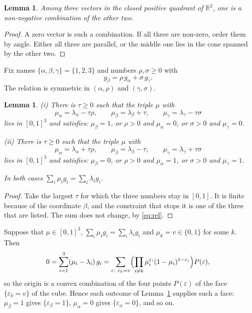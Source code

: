 \documentclass[11pt]{article}
\newtheorem{lemma}[theorem]{Lemma}
\theoremstyle{definition}
\newcommand{\R}{\mathbb{R}}
\newcommand{\eps}{\varepsilon}
\begin{document}
\begin{lemma}\label{lem:middle}
Among three vectors in the closed positive quadrant of $\R^2$, one is a
non-negative combination of the other two.
\end{lemma}
\begin{proof}
A zero vector is such a combination.  If all three are non-zero, order
them by angle.  Either all three are parallel, or the middle one lies in
the cone spanned by the other two.
\end{proof}

Fix names $\{\alpha,\beta,\gamma\}=\{1,2,3\}$ and numbers
$\rho,\sigma\ge0$ with
\begin{equation}\label{eq:rel}
 g_\beta=\rho\,g_\alpha+\sigma\,g_\gamma .
\end{equation}
The relation is symmetric in $(\alpha,\rho)$ and $(\gamma,\sigma)$.

\begin{lemma}\label{lem:slide}
\textup{(i)} There is $\tau\ge0$ such that the triple $\mu$ with
\[
 \mu_\alpha=\lambda_\alpha-\tau\rho,\qquad
 \mu_\beta=\lambda_\beta+\tau,\qquad
 \mu_\gamma=\lambda_\gamma-\tau\sigma
\]
lies in $[0,1]^3$ and satisfies: $\mu_\beta=1$, or $\rho>0$ and
$\mu_\alpha=0$, or $\sigma>0$ and $\mu_\gamma=0$.

\textup{(ii)} There is $\tau\ge0$ such that the triple $\mu$ with
\[
 \mu_\alpha=\lambda_\alpha+\tau\rho,\qquad
 \mu_\beta=\lambda_\beta-\tau,\qquad
 \mu_\gamma=\lambda_\gamma+\tau\sigma
\]
lies in $[0,1]^3$ and satisfies: $\mu_\beta=0$, or $\rho>0$ and
$\mu_\alpha=1$, or $\sigma>0$ and $\mu_\gamma=1$.

In both cases $\sum_i\mu_ig_i=\sum_i\lambda_ig_i$.
\end{lemma}
\begin{proof}
Take the largest $\tau$ for which the three numbers stay in $[0,1]$.  It
is finite because of the coordinate $\beta$, and the constraint that stops
it is one of the three that are listed.  The sum does not change, by
\eqref{eq:rel}.
\end{proof}

Suppose that $\mu\in[0,1]^3$, $\sum_i\mu_ig_i=\sum_i\lambda_ig_i$ and
$\mu_k=v\in\{0,1\}$ for some $k$.  Then
\begin{equation}\label{eq:hull}
 0=\sum_{i=1}^{3}(\mu_i-\lambda_i)\,g_i
 =\sum_{\eps:\ \eps_k=v}\Bigl(\prod_{i\ne k}\mu_i^{\eps_i}(1-\mu_i)^{1-\eps_i}\Bigr)P(\eps),
\end{equation}
so the origin is a convex combination of the four points $P(\eps)$ of the
face $\{\eps_k=v\}$ of the cube.  Hence each outcome of
Lemma~\ref{lem:slide} supplies such a face: $\mu_\beta=1$ gives
$\{\eps_\beta=1\}$, $\mu_\alpha=0$ gives $\{\eps_\alpha=0\}$, and so on.
\end{document}
